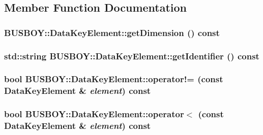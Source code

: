 \subsection{Member Function Documentation}
\hypertarget{classBUSBOY_1_1DataKeyElement_a381d5ddc6610072f1cf9464d88b838ee}{
\subsubsection[{getDimension}]{ BUSBOY::DataKeyElement::getDimension () const}}
\label{classBUSBOY_1_1DataKeyElement_a381d5ddc6610072f1cf9464d88b838ee}
\hypertarget{classBUSBOY_1_1DataKeyElement_afd0c6e49ab20d504ee8ee280abe51364}{
\subsubsection[{getIdentifier}]{\setlength{\rightskip}{0pt plus 5cm}std::string BUSBOY::DataKeyElement::getIdentifier () const}}
\label{classBUSBOY_1_1DataKeyElement_afd0c6e49ab20d504ee8ee280abe51364}
\hypertarget{classBUSBOY_1_1DataKeyElement_a00d80857330b83c58d6e0476fb3e646e}{
\subsubsection[{operator!=}]{\setlength{\rightskip}{0pt plus 5cm}bool BUSBOY::DataKeyElement::operator!= (const {\bf DataKeyElement} \& {\em element}) const}}
\label{classBUSBOY_1_1DataKeyElement_a00d80857330b83c58d6e0476fb3e646e}
\hypertarget{classBUSBOY_1_1DataKeyElement_a8c83f858dbda1cb7f3fe0cc5c5008719}{
\subsubsection[{operator$<$}]{\setlength{\rightskip}{0pt plus 5cm}bool BUSBOY::DataKeyElement::operator$<$ (const {\bf DataKeyElement} \& {\em element}) const}}
